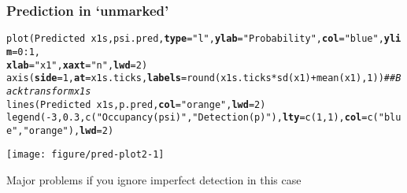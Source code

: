 \documentclass[color=usenames,dvipsnames]{beamer}\usepackage[]{graphicx}\usepackage[]{color}
\makeatletter
\newcommand{\hlnum}[1]{\textcolor[rgb]{0.69,0.494,0}{#1}}%
\newcommand{\hlstr}[1]{\textcolor[rgb]{0.749,0.012,0.012}{#1}}%
\newcommand{\hlcom}[1]{\textcolor[rgb]{0.514,0.506,0.514}{\textit{#1}}}%
\newcommand{\hlopt}[1]{\textcolor[rgb]{0,0,0}{#1}}%
\newcommand{\hlstd}[1]{\textcolor[rgb]{0,0,0}{#1}}%
\newcommand{\hlkwc}[1]{\textcolor[rgb]{0,0,0}{\textbf{#1}}}%
\newcommand{\hlkwd}[1]{\textcolor[rgb]{0.004,0.004,0.506}{#1}}%
\newenvironment{kframe}{%
 \def\at@end@of@kframe{}%
 \ifinner\ifhmode%
  \def\at@end@of@kframe{\end{minipage}}%
  \begin{minipage}{\columnwidth}%
 \fi\fi%
 \def\FrameCommand##1{\hskip\@totalleftmargin \hskip-\fboxsep
 \colorbox{shadecolor}{##1}\hskip-\fboxsep
     \hskip-\linewidth \hskip-\@totalleftmargin \hskip\columnwidth}%
 \MakeFramed {\advance\hsize-\width
   \@totalleftmargin\z@ \linewidth\hsize
   \@setminipage}}%
 {\par\unskip\endMakeFramed%
 \at@end@of@kframe}
\newenvironment{knitrout}{}{} %
\makeatother
\begin{document}




\begin{frame}[fragile]
  \frametitle{Prediction in `unmarked'}
\begin{knitrout}\tiny
{}\color{fgcolor}\begin{kframe}
\begin{alltt}
\hlkwd{plot}\hlstd{(Predicted} \hlopt{~} \hlstd{x1s, psi.pred,} \hlkwc{type}\hlstd{=}\hlstr{"l"}\hlstd{,} \hlkwc{ylab}\hlstd{=}\hlstr{"Probability"}\hlstd{,} \hlkwc{col}\hlstd{=}\hlstr{"blue"}\hlstd{,} \hlkwc{ylim}\hlstd{=}\hlnum{0}\hlopt{:}\hlnum{1}\hlstd{,}
     \hlkwc{xlab}\hlstd{=}\hlstr{"x1"}\hlstd{,} \hlkwc{xaxt}\hlstd{=}\hlstr{"n"}\hlstd{,} \hlkwc{lwd}\hlstd{=}\hlnum{2}\hlstd{)}
\hlkwd{axis}\hlstd{(}\hlkwc{side}\hlstd{=}\hlnum{1}\hlstd{,} \hlkwc{at}\hlstd{=x1s.ticks,} \hlkwc{labels}\hlstd{=}\hlkwd{round}\hlstd{(x1s.ticks}\hlopt{*}\hlkwd{sd}\hlstd{(x1)}\hlopt{+}\hlkwd{mean}\hlstd{(x1),}\hlnum{1}\hlstd{))} \hlcom{## Backtransform x1s}
\hlkwd{lines}\hlstd{(Predicted} \hlopt{~} \hlstd{x1s, p.pred,} \hlkwc{col}\hlstd{=}\hlstr{"orange"}\hlstd{,} \hlkwc{lwd}\hlstd{=}\hlnum{2}\hlstd{)}
\hlkwd{legend}\hlstd{(}\hlopt{-}\hlnum{3}\hlstd{,} \hlnum{0.3}\hlstd{,} \hlkwd{c}\hlstd{(}\hlstr{"Occupancy (psi)"}\hlstd{,} \hlstr{"Detection (p)"}\hlstd{),} \hlkwc{lty}\hlstd{=}\hlkwd{c}\hlstd{(}\hlnum{1}\hlstd{,} \hlnum{1}\hlstd{),} \hlkwc{col}\hlstd{=}\hlkwd{c}\hlstd{(}\hlstr{"blue"}\hlstd{,} \hlstr{"orange"}\hlstd{),} \hlkwc{lwd}\hlstd{=}\hlnum{2}\hlstd{)}
\end{alltt}
\end{kframe}

{\centering \texttt{[image: figure/pred-plot2-1]} 

}


\end{knitrout}
\small
\centering
Major problems if you ignore imperfect detection in this case \\
\end{frame}
\end{document}
